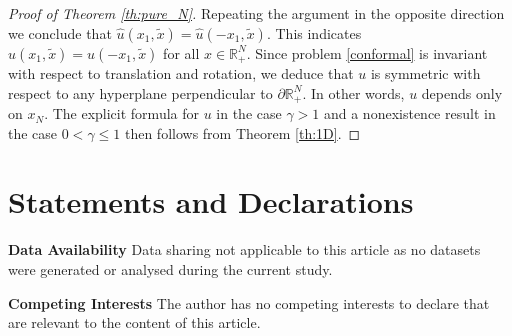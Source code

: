 \documentclass[reqno]{amsart}
\theoremstyle{plain}
\theoremstyle{definition}
\theoremstyle{remark}
\begin{document}
\begin{proof}[Proof of Theorem \ref{th:pure_N}]
		Repeating the argument in the opposite direction we conclude that $\hat u(x_1, \tilde{x})=\hat u(-x_1, \tilde{x})$. This indicates $u(x_1, \tilde{x})=u(-x_1, \tilde{x})$ for all $x\in\mathbb{R}^N_+$. Since problem \eqref{conformal} is invariant with respect to translation and rotation, we deduce that $u$ is symmetric with respect to any hyperplane perpendicular to $\partial\mathbb{R}^N_+$. In other words, $u$ depends only on $x_N$.	
		The explicit formula for $u$ in the case $\gamma>1$ and a nonexistence result in the case $0<\gamma\le1$ then follows from Theorem \ref{th:1D}.
	\end{proof}
	\section*{Statements and Declarations}
	
	
	\textbf{Data Availability} Data sharing not applicable to this article as no datasets were generated or analysed during the current study.
	
	\textbf{Competing Interests} The author has no competing interests to declare that are relevant to the content of this article.
	
	
	
	
	
\end{document}
